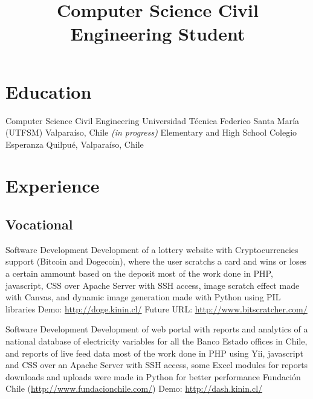 \documentclass[11pt,a4paper,sans]{moderncv}
\title{Computer Science Civil Engineering Student}
\begin{document}
\maketitle



	   
\section{Education}

        {Computer Science Civil Engineering}
        {Universidad Técnica Federico Santa María (UTFSM)}
        {Valparaíso, Chile}
        {\emph{(in progress)}}
        {}
        {Elementary and High School}
        {Colegio Esperanza}
        {Quilpué, Valparaíso, Chile}
        {}{}

\section{Experience}
\subsection{Vocational}

        {Software Development}
        {Development of a lottery website with Cryptocurrencies support (Bitcoin and Dogecoin), where the user scratchs a card and wins or loses a certain ammount based on the deposit}
        {most of the work done in PHP, javascript, CSS over Apache Server with SSH access, image scratch effect made with Canvas, and dynamic image generation made with Python using PIL libraries}
        {}
        {Demo: \url{http://doge.kinin.cl/} Future URL: \url{http://www.bitscratcher.com/}}

        {Software Development}
        {Development of web portal with reports and analytics of a national database of electricity variables for all the Banco Estado offices in Chile, and reports of live feed data}
        {most of the work done in PHP using Yii, javascript and CSS over an Apache Server with SSH access, some Excel modules for reports downloads and uploads were made in Python for better performance}
        {Fundación Chile (\url{http://www.fundacionchile.com/})}
        {Demo: \url{http://dash.kinin.cl/}}
\end{document}
